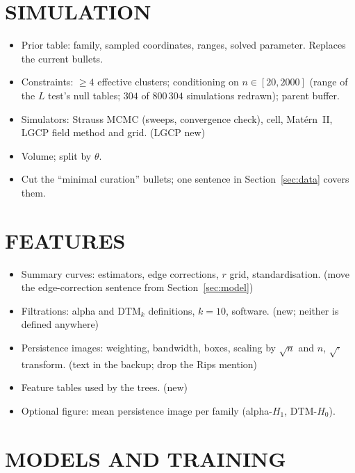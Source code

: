 \documentclass[twoside]{article}
\begin{document}
\section{SIMULATION}
\label{app:data}

\begin{itemize}
  \item Prior table: family, sampled coordinates, ranges, solved parameter. Replaces the current bullets.
  \item Constraints: $\ge4$ effective clusters; conditioning on $n\in[20,2000]$ (range of the $L$ test's null tables; $304$ of $800\,304$ simulations redrawn); parent buffer.
  \item Simulators: Strauss MCMC (sweeps, convergence check), cell, Mat\'ern~II, LGCP field method and grid. (LGCP new)
  \item Volume; split by $\theta$.
  \item Cut the ``minimal curation'' bullets; one sentence in Section~\ref{sec:data} covers them.
\end{itemize}

\section{FEATURES}
\label{app:features}

\begin{itemize}
  \item Summary curves: estimators, edge corrections, $r$ grid, standardisation. (move the edge-correction sentence from Section~\ref{sec:model})
  \item Filtrations: alpha and DTM$_k$ definitions, $k=10$, software. (new; neither is defined anywhere)
  \item Persistence images: weighting, bandwidth, boxes, scaling by $\sqrt n$ and $n$, $\sqrt{\cdot}$ transform. (text in the backup; drop the Rips mention)
  \item Feature tables used by the trees. (new)
  \item Optional figure: mean persistence image per family (alpha-$H_1$, DTM-$H_0$).
\end{itemize}

\section{MODELS AND TRAINING}
\label{app:models}
\end{document}
